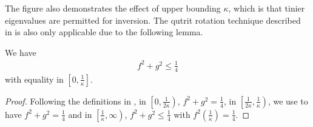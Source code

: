 The figure also demonstrates the effect of upper bounding \(\kappa\), which is that tinier eigenvalues are permitted for inversion. The qutrit rotation technique described in  is also only applicable due to the following lemma.
\begin{lemma} \label{filter_functions_square_sum_bound}
    We have
    \begin{align}
        f^2 + g^2 \leq \frac{1}{4}
    \end{align}
    with equality in \(\left[0, \frac{1}{\kappa}\right]\).
\end{lemma}
\begin{proof}
    Following the definitions in , in \(\left[0, \frac{1}{2\kappa}\right)\), \(f^2 + g^2 = \frac{1}{4}\), in \(\left[\frac{1}{2\kappa}, \frac{1}{\kappa}\right)\), we use  to have \(f^2 + g^2 = \frac{1}{4}\) and in \(\left[\frac{1}{\kappa}, \infty\right)\), \(f^2+g^2 \leq \frac{1}{4}\) with \(f^2\left(\frac{1}{\kappa}\right) = \frac{1}{4}\).
\end{proof}

